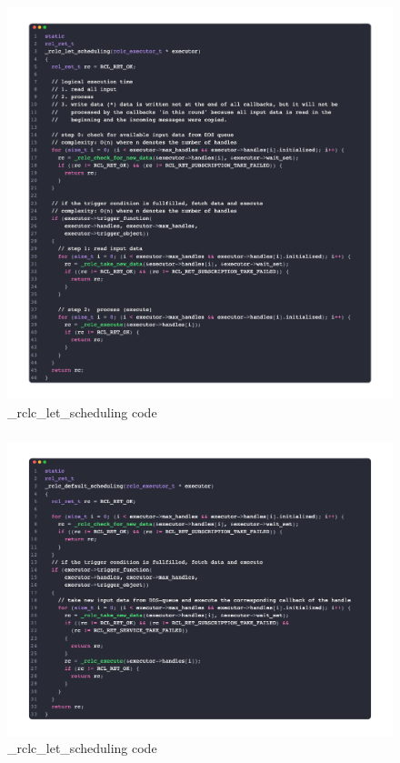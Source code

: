 \begin{figure}[htbp!]
    \centering
    \includegraphics[width=1\linewidth]{Img/code/rclc/_rclc_let_scheduling.png}
    \caption{\_rclc\_let\_scheduling code}
    \vspace{-0.1in}
\end{figure}

\subsubsection{}
\begin{figure}[htbp!]
    \centering
    \includegraphics[width=1\linewidth]{Img/code/rclc/_rclc_default_scheduling.png}
    \caption{\_rclc\_let\_scheduling code}
    \vspace{-0.1in}
\end{figure}

